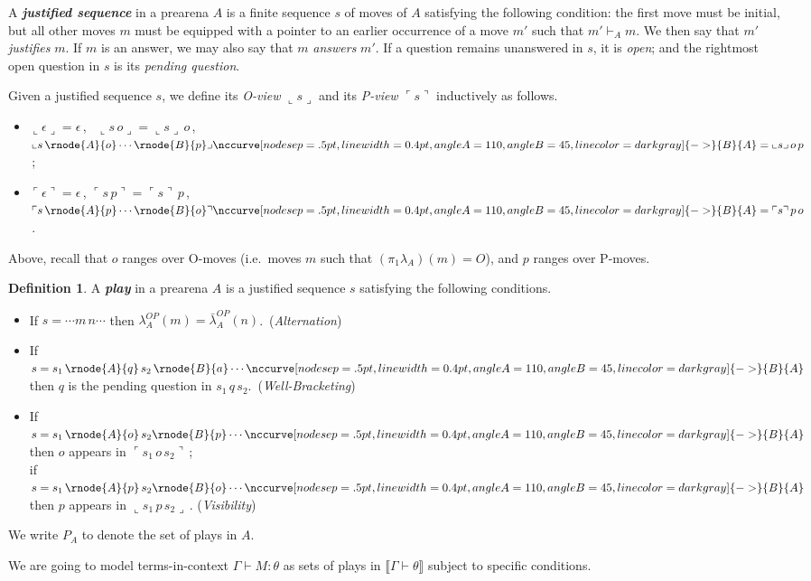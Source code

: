 \documentclass{CSML}
\theoremstyle{definition}\newtheorem{definition}[thm]{Definition}
\theoremstyle{definition}\newtheorem{example}[thm]{Example}
\theoremstyle{definition}\newtheorem{proposition}[thm]{Proposition}
\theoremstyle{definition}\newtheorem{lemma}[thm]{Lemma}
\theoremstyle{definition}\newtheorem{theorem}[thm]{Theorem}
\theoremstyle{definition}\newtheorem{corollary}[thm]{Corollary}
\theoremstyle{definition}\newtheorem{remark}[thm]{Remark}
\newcommand\nt[1]{#1}
\newcommand\justf[3][]{\nccurve[nodesep=.5pt,linewidth=0.4pt,angleA=110,angleB=45,linecolor=darkgray#1]{->}{#2}{#3}}
\newcommand\ov[1]{\llcorner{#1}\lrcorner}
\newcommand\plays[1]{P_{#1}}
\newcommand\boldemph[1]{\emph{\textbf{#1}}}
\newcommand\pview[1]{\ulcorner{#1}\urcorner}
\newcommand\pv[1]{\pview{#1}}
\newcommand\oview[1]{\llcorner{#1}\lrcorner}
\newcommand\sem[1]{\llbracket #1 \rrbracket}
\begin{document}
A \boldemph{justified sequence} in a prearena $A$ is a finite sequence $s$
of moves of $A$ satisfying the following condition: the first move must be initial,
but all other moves $m$ must be equipped with a pointer  to an earlier
occurrence of a move $m'$ such that $m'\vdash_A m$.
\nt{We then say that $m'$ \emph{justifies} $m$. If $m$ is an answer, we may also say that $m$ \emph{answers} $m'$.
If a question remains unanswered in $s$, it is \emph{open}; and the rightmost open question in $s$ is its \emph{pending question}.}

Given a justified sequence $s$, we define its \emph{O-view }$\oview{s}$ and its \emph{P-view} $\pview{s}$ inductively as follows.
\begin{itemize}
\item $\oview{\epsilon}=\epsilon$\,, \,
$\oview{s\, o}= \oview{s}\, o$\,, \,
$\oview{s\, \rnode{A}{o}\cdots \rnode{B}{p}}\justf{B}{A} =  \oview{s}\,o\,p$\,;
\item
$\pview{\epsilon} = \epsilon$\,,
$\pview{s\, p} = \pview{s}\, p$\,,
$\pview{s\, \rnode{A}{p}\cdots \rnode{B}{o}}\justf{B}{A} =   \pview{s}\,p\,o$\,.
\end{itemize}
Above, \nt{recall that} $o$ ranges over O-moves (i.e.\ moves $m$ such that $(\pi_1\lambda_A)(m)=O$), and $p$ ranges over P-moves.

\begin{definition}
A \boldemph{play} in a prearena $A$ is a justified sequence $s$ satisfying
the following conditions.
\begin{itemize}
\item If $s=\cdots m\,n\cdots$ then $\lambda_A^{OP}(m)=\bar{\lambda}_A^{OP}(n)$.\ (\emph{Alternation})
\item If $s=s_1\, \rnode{A}{q}\,s_2\,\rnode{B}{a}\cdots\justf{B}{A}$ then $q$ is the pending question in $s_1\,q\,s_2$.\
(\emph{Well-Bracketing})
\item
If $s=s_1\,\rnode{A}{o}\,s_2\rnode{B}{p}\cdots\justf{B}{A}$ then $o$ appears in $\pv{s_1\,o\,s_2}$\,;\\ 
if  $s=s_1\, \rnode{A}{p}\,s_2\rnode{B}{o}\cdots\justf{B}{A}$ then $p$ appears in $\ov{s_1\,p\,s_2}$\,.
(\emph{Visibility})
\end{itemize}
We write $\plays{A}$ to denote the set of plays in $A$.
\end{definition}



We are going to model terms-in-context $\Gamma\vdash M:\theta$ as sets of plays in $\sem{\Gamma\vdash\theta}$ subject to specific conditions.
\end{document}
